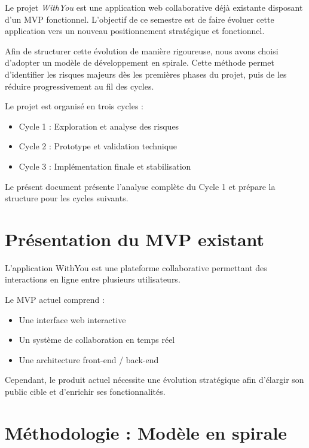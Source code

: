 \documentclass[12pt,a4paper]{report}
\begin{document}
Le projet \textit{WithYou} est une application web collaborative déjà existante disposant d’un MVP fonctionnel. 
L’objectif de ce semestre est de faire évoluer cette application vers un nouveau positionnement stratégique et fonctionnel.

Afin de structurer cette évolution de manière rigoureuse, nous avons choisi d’adopter un modèle de développement en spirale. 
Cette méthode permet d’identifier les risques majeurs dès les premières phases du projet, puis de les réduire progressivement au fil des cycles.

Le projet est organisé en trois cycles :
\begin{itemize}
    \item Cycle 1 : Exploration et analyse des risques
    \item Cycle 2 : Prototype et validation technique
    \item Cycle 3 : Implémentation finale et stabilisation
\end{itemize}

Le présent document présente l’analyse complète du Cycle 1 et prépare la structure pour les cycles suivants.

\chapter{Présentation du MVP existant}

L’application WithYou est une plateforme collaborative permettant des interactions en ligne entre plusieurs utilisateurs.

Le MVP actuel comprend :
\begin{itemize}
    \item Une interface web interactive
    \item Un système de collaboration en temps réel
    \item Une architecture front-end / back-end
\end{itemize}

Cependant, le produit actuel nécessite une évolution stratégique afin d’élargir son public cible et d’enrichir ses fonctionnalités.

\chapter{Méthodologie : Modèle en spirale}
\end{document}
